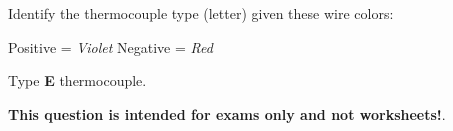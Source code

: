 

Identify the thermocouple type (letter) given these wire colors:

\vskip 10pt

Positive = {\it Violet} \hskip 50pt Negative = {\it Red}







Type {\bf E} thermocouple.







{\bf This question is intended for exams only and not worksheets!}.


